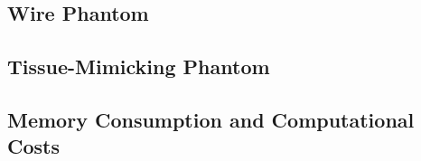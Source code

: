 \subsection{Wire Phantom}


\subsection{Tissue-Mimicking Phantom}


\subsection{Memory Consumption and Computational Costs}

